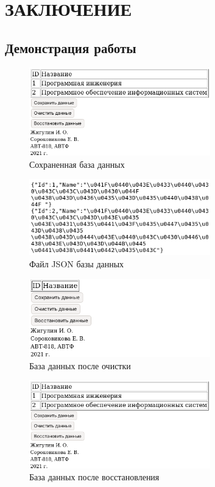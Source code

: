 \chapter{ЗАКЛЮЧЕНИЕ}

\section{Демонстрация работы}

\begin{figure}[H]
	\centering
	\includegraphics[width=0.7\textwidth]{01}
	\caption{Сохраненная база данных}
\end{figure}

\begin{figure}[H]
	\centering
	\includegraphics[width=0.7\textwidth]{02}
	\caption{Файл JSON базы данных}
\end{figure}

\begin{figure}[H]
	\centering
	\includegraphics[width=0.7\textwidth]{03}
	\caption{База данных после очистки}
\end{figure}

\begin{figure}[H]
	\centering
	\includegraphics[width=0.7\textwidth]{01}
	\caption{База данных после восстановления}
\end{figure}

